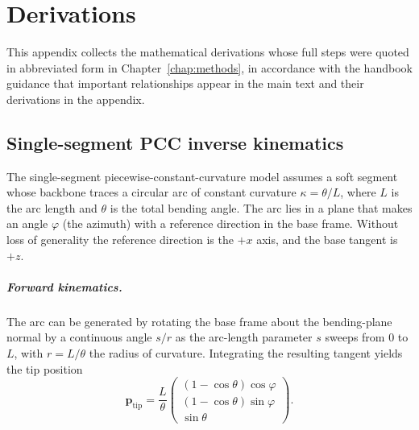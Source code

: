 \chapter{Derivations}
\label{app:derivations}

This appendix collects the mathematical derivations whose full steps were quoted in abbreviated form in Chapter~\ref{chap:methods}, in accordance with the handbook guidance that important relationships appear in the main text and their derivations in the appendix.

\section{Single-segment PCC inverse kinematics}
\label{app:deriv_pcc}

The single-segment piecewise-constant-curvature model assumes a soft segment whose backbone traces a circular arc of constant curvature $\kappa = \theta / L$, where $L$ is the arc length and $\theta$ is the total bending angle. The arc lies in a plane that makes an angle $\varphi$ (the azimuth) with a reference direction in the base frame. Without loss of generality the reference direction is the $+x$ axis, and the base tangent is $+z$.

\paragraph{Forward kinematics.}
The arc can be generated by rotating the base frame about the bending-plane normal by a continuous angle $s/r$ as the arc-length parameter $s$ sweeps from $0$ to $L$, with $r = L/\theta$ the radius of curvature. Integrating the resulting tangent yields the tip position
\begin{equation}
  \mathbf{p}_{\mathrm{tip}} = \frac{L}{\theta} \begin{pmatrix} (1 - \cos\theta)\cos\varphi \\ (1 - \cos\theta)\sin\varphi \\ \sin\theta \end{pmatrix}.
  \label{eq:deriv_pcc_fk}
\end{equation}


